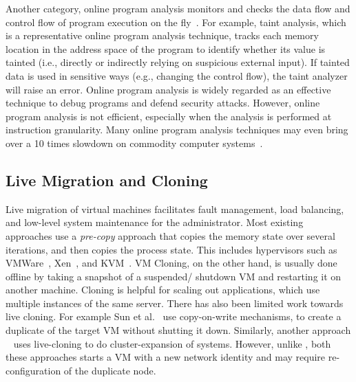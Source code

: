 Another category, online program analysis monitors and checks the data flow and control flow of program execution on the fly~\cite{goodstein2015tracking,ganai2012dtam}.
For example, taint analysis, which is a representative online program analysis technique, tracks each memory location in the address space of the program to identify whether its value is tainted (i.e., directly or indirectly relying on suspicious external input). 
If tainted data is used in sensitive ways (e.g., changing the control flow), the taint analyzer will raise an error. 
Online program analysis is widely regarded as an effective technique to debug programs and defend security attacks. 
However, online program analysis is not efficient, especially when the analysis is performed at instruction granularity. 
Many online program analysis techniques may even bring over a 10 times slowdown on commodity computer systems~\cite{Newsome05dynamictaint}.

\subsection{Live Migration and Cloning}
Live migration of virtual machines facilitates fault management, load balancing, and low-level system maintenance for the administrator.
Most existing approaches use a \textit{pre-copy} approach that copies the memory state over several iterations, and then copies the process state.
This includes hypervisors such as VMWare~\cite{nelson2005fast}, Xen~\cite{clark2005live}, and KVM~\cite{kivity2007kvm}.
VM Cloning, on the other hand, is usually done offline by taking a snapshot of a suspended/ shutdown VM and restarting it on another machine.
Cloning is helpful for scaling out applications, which use multiple instances of the same server.
There has also been limited work towards live cloning. 
For example Sun et al.~\cite{Sun:2009:FLC:1581383.1582148} use copy-on-write mechanisms, to create a duplicate of the target VM without shutting it down.
Similarly, another approach ~\cite{gebhart2009dynamic} uses live-cloning to do cluster-expansion of systems.
However, unlike \parikshan, both these approaches starts a VM with a new network identity and may require re-configuration of the duplicate node.


